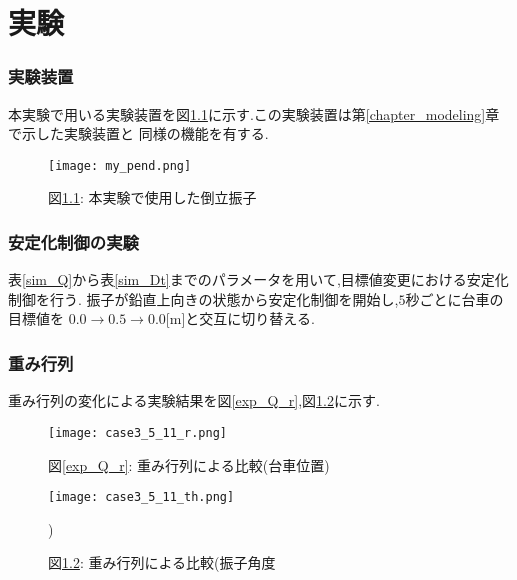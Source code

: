 \chapter{実験}

\subsection{実験装置}
本実験で用いる実験装置を図\ref{my_pend}に示す.この実験装置は第\ref{chapter_modeling}章で示した実験装置と
同様の機能を有する.

\begin{figure}[htbp]
    \begin{center}
        \texttt{[image: my\_pend.png]}
        \caption{図\ref{my_pend}: 本実験で使用した倒立振子}
        \label{my_pend}
    \end{center}
\end{figure}


\subsection{安定化制御の実験}
表\ref{sim_Q}から表\ref{sim_Dt}までのパラメータを用いて,目標値変更における安定化制御を行う.
振子が鉛直上向きの状態から安定化制御を開始し,$5$秒ごとに台車の目標値を
$0.0 \to 0.5 \to 0.0$[m]と交互に切り替える.

\subsection{重み行列}
重み行列の変化による実験結果を図\ref{exp_Q_r},図\ref{exp_Q_th}に示す.

\begin{figure}[htbp]
    \begin{minipage}{0.5\hsize}
        \begin{center}
            \texttt{[image: case3\_5\_11\_r.png]}
            \caption{図\ref{exp_Q_r}: 重み行列による比較(台車位置)}
            \label{exp_Q_r}
        \end{center}
    \end{minipage}
    \begin{minipage}{0.5\hsize}
        \begin{center}
            \texttt{[image: case3\_5\_11\_th.png]}
            \caption{図\ref{exp_Q_th}: 重み行列による比較(振子角度})
            \label{exp_Q_th}
        \end{center}
    \end{minipage}
\end{figure}

